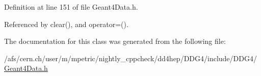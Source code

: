 Definition at line 151 of file Geant4Data.h.

Referenced by clear(), and operator=().

The documentation for this class was generated from the following file:\begin{DoxyCompactItemize}
\item 
/afs/cern.ch/user/m/mpetric/nightly\_\-cppcheck/dd4hep/DDG4/include/DDG4/\hyperlink{_geant4_data_8h}{Geant4Data.h}\end{DoxyCompactItemize}

